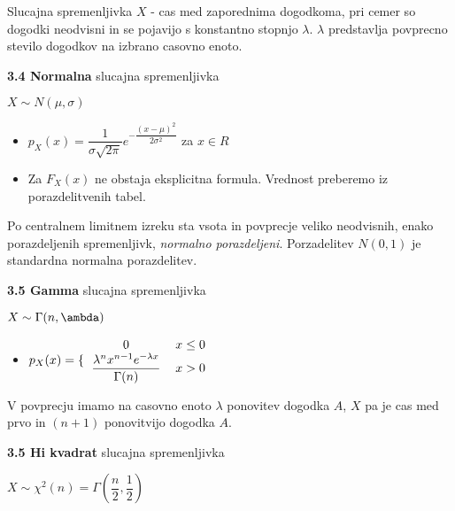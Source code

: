 \documentclass{article}
\begin{document}
\begin{multicols}{3}
Slucajna spremenljivka $X$ - cas med zaporednima dogodkoma,
pri cemer so dogodki neodvisni in se pojavijo s konstantno
stopnjo $\lambda$. $\lambda$ predstavlja povprecno stevilo dogodkov
na izbrano casovno enoto.

\textbf{3.4 Normalna} slucajna spremenljivka
\begin{center}
    \begin{math}
        X \sim N(\mu, \sigma )
    \end{math}
\end{center}

\begin{itemize}
    \item  \begin{math}
        p_{X}(x) = \dfrac{1}{\sigma \sqrt{2 \pi}} e^{- \dfrac{(x - \mu)^{2}}{2 \sigma^{2}}}
    \end{math} za $x \in R$ 
    
     \item Za $F_{X}(x)$ ne obstaja eksplicitna formula. Vrednost preberemo iz porazdelitvenih tabel.
\end{itemize}
Po centralnem limitnem izreku sta vsota in povprecje veliko neodvisnih, enako porazdeljenih
spremenljivk, \textit{normalno porazdeljeni}.
Porzadelitev $N(0, 1)$ je standardna normalna porazdelitev.

\textbf{3.5 Gamma} slucajna spremenljivka
\begin{center}
    \begin{math}
        X \sim \Gamma(n, \ambda)
    \end{math}
\end{center}

\begin{itemize}
    \item  \begin{math}
        p_{X}(x) =
        \{\begin{tabular}{ccc}
          $0$  & $x \leq 0$ & \\
          $\dfrac{\lambda^{n} x^{n- 1} e^{ - \lambda x}}{\Gamma(n)}$ & $x > 0$ & \\
        \end{tabular}
    \end{math} 
\end{itemize}

V povprecju imamo na casovno enoto $\lambda$ ponovitev dogodka $A$, $X$ pa je cas med
prvo in $(n + 1)$ ponovitvijo dogodka $A$.

\textbf{3.5 Hi kvadrat} slucajna spremenljivka
\begin{center}
    \begin{math}
        X \sim  \chi^{2}(n) = \Gamma(\dfrac{n}{2}, \dfrac{1}{2})
    \end{math}
\end{center}


\end{multicols}
\end{document}
